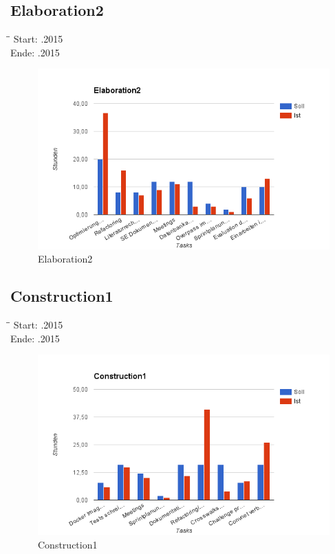 \subsection{Elaboration2}
\begin{tabbing}[H]
    \hspace*{6cm}\=\hspace*{6cm}\= \kill
    Start: .2015 \\
	Ende: .2015 \\
\end{tabbing}
\begin{figure}[H]
\includegraphics[width=\textwidth]{images/elab2.png}
\caption[Elaboration2]{Elaboration2}
\end{figure}

\subsection{Construction1}
\begin{tabbing}[H]
    \hspace*{6cm}\=\hspace*{6cm}\= \kill
    Start: .2015 \\
	Ende: .2015 \\
\end{tabbing}
\begin{figure}[H]
\includegraphics[width=\textwidth]{images/construction1.png}
\caption[Construction1]{Construction1}
\end{figure}

